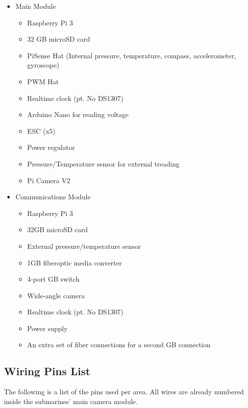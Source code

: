 \documentclass[
18pt, %
a4paper, %
oneside, %
headinclude,footinclude, %
]{scrartcl}
\begin{document}
\begin{itemize}
	\item Main Module
	\begin{itemize}
		\item Raspberry Pi 3
		\item 32 GB microSD card
		\item PiSense Hat (Internal pressure, temperature, compass, accelerometer, gyroscope)
		\item PWM Hat
		\item Realtime clock (pt. No DS1307)
		\item Arduino Nano for reading voltage
		\item ESC (x5)
		\item Power regulator
		\item Pressure/Temperature sensor for external treading
		\item Pi Camera V2
	\end{itemize}
	\item Communications Module
	\begin{itemize}
		\item Raspberry Pi 3
		\item 32GB microSD card
		\item External pressure/temperature sensor
		\item 1GB fiberoptic media converter
		\item 4-port GB switch
		\item Wide-angle camera
		\item Realtime clock (pt. No DS1307)
		\item Power supply
		\item An extra set of fiber connections for a second GB connection
	\end{itemize}
\end{itemize}


\subsection{Wiring Pins List}

The following is a list of the pins used per area. All wires are already numbered inside the submarines' main camera module. 
\end{document}
